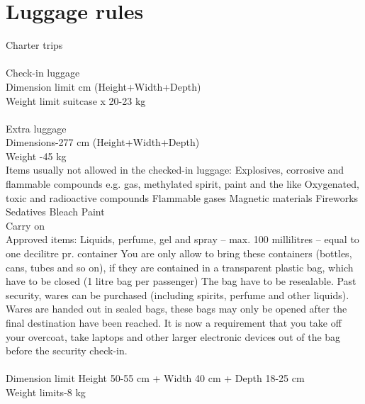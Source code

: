\section{Luggage rules}
Charter trips\\
\\
Check-in luggage\\
Dimension limit\indent\indent{} cm (Height+Width+Depth)
\\
Weight limit\indent\indent\indent{} suitcase x 20-23 kg
\\
\\
Extra luggage\\
Dimensions\indent\indent\indent{}-277 cm (Height+Width+Depth)\\
Weight \indent\indent\indent \indent{}-45 kg
\\
Items usually not allowed in the checked-in luggage:
Explosives, corrosive and flammable compounds e.g. gas, methylated spirit, paint and the like  
Oxygenated, toxic and radioactive compounds 
Flammable gases 
Magnetic materials 
Fireworks 
Sedatives 
Bleach 
Paint
\\
Carry on\\
Approved items: Liquids, perfume, gel and spray – max. 100 millilitres – equal to one decilitre pr. container
You are only allow to bring these containers (bottles, cans, tubes and so on), if they are contained in a transparent plastic bag, which have to be closed (1 litre bag per passenger)
The bag have to be resealable.
Past security, wares can be purchased (including spirits, perfume and other liquids). Wares are handed out in sealed bags, these bags may only be opened after the final destination have been reached.
It is now a requirement that you take off your overcoat, take laptops and other larger electronic devices out of the bag before the security check-in.
\\
\\
Dimension limit \indent\indent\indent	Height 50-55 cm + Width 40 cm + Depth 18-25 cm
\\
Weight limits\indent\indent\indent{}-8 kg